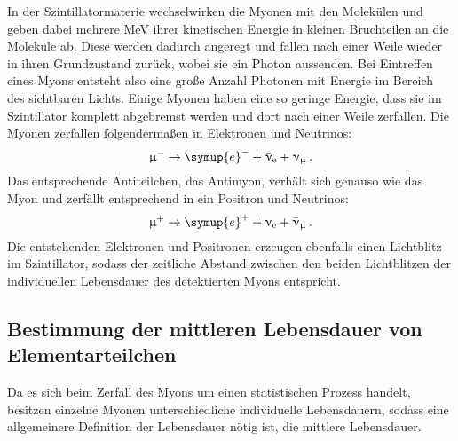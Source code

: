 In der Szintillatormaterie wechselwirken die Myonen mit den Molekülen und geben dabei mehrere MeV ihrer kinetischen Energie in kleinen
Bruchteilen an die Moleküle ab. Diese werden dadurch angeregt und fallen nach einer Weile wieder in ihren Grundzustand zurück, wobei
sie ein Photon aussenden. Bei Eintreffen eines Myons entsteht also eine große Anzahl Photonen mit Energie im Bereich des sichtbaren
Lichts. Einige Myonen haben eine so geringe Energie, dass sie im Szintillator komplett abgebremst werden und dort nach einer Weile
zerfallen. Die Myonen zerfallen folgendermaßen in Elektronen und Neutrinos:
\begin{equation*}
  \upmu^- \to \symup{e}^- + \bar{\upnu}_\text{e} + \upnu_{\upmu} \,.
\end{equation*}
Das entsprechende Antiteilchen, das Antimyon, verhält sich genauso wie das Myon und zerfällt entsprechend in ein Positron und Neutrinos:
\begin{equation*}
  \upmu^+ \to \symup{e}^+ + \upnu_\text{e} + \bar{\upnu}_{\upmu} \,.
\end{equation*}
Die entstehenden Elektronen und Positronen erzeugen ebenfalls einen Lichtblitz im Szintillator, sodass der zeitliche Abstand zwischen
den beiden Lichtblitzen der individuellen Lebensdauer des detektierten Myons entspricht.

\subsection{Bestimmung der mittleren Lebensdauer von Elementarteilchen}
Da es sich beim Zerfall des Myons um einen statistischen Prozess handelt, besitzen einzelne Myonen unterschiedliche individuelle Lebensdauern,
sodass eine allgemeinere Definition der Lebensdauer nötig ist, die mittlere Lebensdauer.
